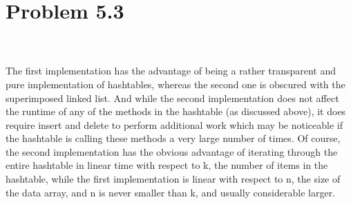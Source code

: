 \documentclass[12pt,letterpaper]{article}
\newcommand\hwnum{5}                  %
\newenvironment{answer}[3]{
  \section*{Problem \hwnum.#1}
}{\newpage}
\begin{document}
\begin{answer}{3}
\textbf{Advantages} \\\\
The first implementation has the advantage of being a rather transparent and pure implementation of hashtables, whereas the second one is obscured with the superimposed linked list. And while the second implementation does not affect the runtime of any of the methods in the hashtable (as discussed above), it does require insert and delete to perform additional work which may be noticeable if the hashtable is calling these methods a very large number of times. Of course, the second implementation has the obvious advantage of iterating through the entire hashtable in linear time with respect to k, the number of items in the hashtable, while the first implementation is linear with respect to n, the size of the data array, and n is never smaller than k, and usually considerable larger.


\end{answer}
\end{document}
